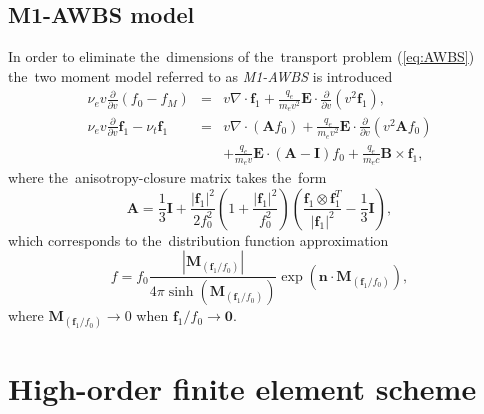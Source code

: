 \documentclass[review]{elsarticle}
\newcommand{\pdv}[2]{\frac{\partial{#1}}{\partial{#2}}}
\newcommand{\vect}[1]{\boldsymbol{#1}}
\newcommand{\matr}[1]{\mathbf{#1}}
\newcommand{\nue}{\nu_{e}}
\newcommand{\nutot}{\nu_{t}}
\newcommand{\vmag}{v}
\newcommand{\vn}{\vect{n}}
\newcommand{\E}{\vect{E}}
\newcommand{\B}{\vect{B}}
\newcommand{\qe}{q_e}
\newcommand{\me}{m_e}
\newcommand{\fM}{f_M}
\newcommand{\fzero}{f_0}
\newcommand{\fone}{\vect{f}_1}
\newcommand{\MI}{\matr{I}}
\newcommand{\MA}{\matr{A}}
\newcommand{\anisomega}{\fone/\fzero}
\newcommand{\acl}{\vect{M}_{\left(\anisomega\right)}}
\renewcommand{\refeq}[1]{(\ref{#1})}
\begin{document}
\subsection{M1-AWBS model}
In order to eliminate the~dimensions of the~transport problem \refeq{eq:AWBS}
the~two moment model referred to as \textit{M1-AWBS} is introduced
\begin{eqnarray}
  \nue\vmag\pdv{}{\vmag}\left(\fzero - \fM \right) &=&
  \vmag\nabla\cdot\fone + \frac{\qe}{\me\vmag^2}\E\cdot\pdv{}{\vmag}
  \left( \vmag^2 \fone\right) , 
  \label{eq:M1f0}\\
  \nue\vmag\pdv{}{\vmag}\fone - \nutot\fone &=& 
  \vmag\nabla\cdot\left(\MA\fzero\right) + 
  \frac{\qe}{\me\vmag^2}\E\cdot\pdv{}{\vmag}
  \left( \vmag^2 \MA\fzero\right) \nonumber\\
  && + \frac{\qe}{\me\vmag}\E\cdot\left( \MA - \MI \right)\fzero +
  \frac{\qe}{\me c}\B\times\fone ,
  \label{eq:M1f1}
\end{eqnarray}
where the~anisotropy-closure matrix takes the~form
\begin{equation}
  \MA = \frac{1}{3}\MI + \frac{|\fone|^2}{2\fzero^2}
  \left( 1 + \frac{|\fone|^2}{\fzero^2} \right)
  \left( \frac{\fone\otimes\fone^T}{|\fone|^2} - \frac{1}{3}\MI\right) ,
\end{equation}
which corresponds to the~distribution function approximation
\begin{equation}
  f = \fzero \frac{\left|\acl\right|}{4\pi\sinh\left(\acl\right)}
  \exp\left(\vn\cdot\acl\right) ,
\end{equation}
where $\acl \rightarrow 0$ when $\anisomega \rightarrow \vect{0}$. 

\section{High-order finite element scheme}\label{sec:hos}

\end{document}
